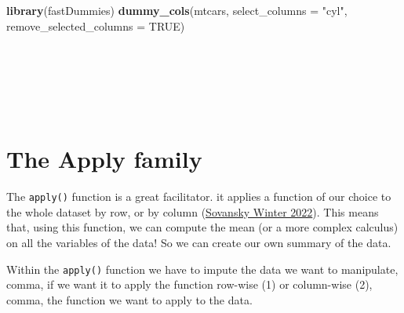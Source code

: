 \documentclass[
]{svmono}
\newenvironment{Shaded}{\begin{snugshade}}{\end{snugshade}}
\newcommand{\AttributeTok}[1]{\textcolor[rgb]{0.13,0.29,0.53}{#1}}
\newcommand{\ConstantTok}[1]{\textcolor[rgb]{0.56,0.35,0.01}{#1}}
\newcommand{\FunctionTok}[1]{\textcolor[rgb]{0.13,0.29,0.53}{\textbf{#1}}}
\newcommand{\NormalTok}[1]{#1}
\newcommand{\StringTok}[1]{\textcolor[rgb]{0.31,0.60,0.02}{#1}}
\begin{document}
\begin{Shaded}
\begin{Highlighting}[]
\FunctionTok{library}\NormalTok{(fastDummies)}
\FunctionTok{dummy\_cols}\NormalTok{(mtcars, }\AttributeTok{select\_columns =} \StringTok{"cyl"}\NormalTok{, }\AttributeTok{remove\_selected\_columns =} \ConstantTok{TRUE}\NormalTok{)}
\end{Highlighting}
\end{Shaded}

~

~

~

\hypertarget{the-apply-family}{%
\section{The Apply family}\label{the-apply-family}}

The \texttt{apply()} function is a great facilitator. it applies a function of
our choice to the whole dataset by row, or by column
(\protect\hyperlink{ref-sovanskywinter2022}{Sovansky Winter 2022}). This means that, using this function, we can
compute the mean (or a more complex calculus) on all the variables of
the data! So we can create our own summary of the data.

Within the \texttt{apply()} function we have to impute the data we want to
manipulate, comma, if we want it to apply the function row-wise (1) or
column-wise (2), comma, the function we want to apply to the data.
\end{document}
